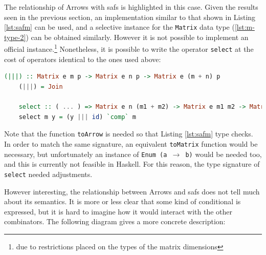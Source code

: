 \documentclass[
  oneside,
  11pt, a4paper,
  footinclude=true,
  headinclude=true,
  cleardoublepage=empty
]{scrbook}
\theoremstyle{definition}
\theoremstyle{definition}
\begin{document}
	    The relationship of Arrows with \glspl{saf} is highlighted in this case. Given the results seen in the previous section, an implementation similar to that shown in Listing \ref{lst:safm} can be used, and a selective instance for the \texttt{Matrix} data type (\ref{lst:m-type-2}) can be obtained similarly. However it is not possible to implement an official instance.\footnote{due to restrictions placed on the types of the matrix dimensions} Nonetheless, it is possible to write the operator \texttt{select} at the cost of operators identical to the ones used above:
	    
        \begin{lstlisting}[language=Haskell, label={lst:safm2}, caption={LAoP Selective instance},captionpos=b]
    (|||) :: Matrix e m p -> Matrix e n p -> Matrix e (m + n) p
    (|||) = Join
    
    select :: ( ... ) => Matrix e n (m1 + m2) -> Matrix e m1 m2 -> Matrix e n m2
    select m y = (y ||| id) `comp` m
        \end{lstlisting}{}
        
        Note that the function \texttt{toArrow} is needed so that Listing \ref{lst:safm} type checks. In order to match the same signature, an equivalent \texttt{toMatrix} function would be necessary, but unfortunately an instance of \texttt{Enum (a $\rightarrow$ b)} would be needed too, and this is currently not feasible in Haskell. For this reason, the type signature of \texttt{select} needed adjustments.
        
        However interesting, the relationship between Arrows and \glspl{saf} does not tell much about its semantics. It is more or less clear that some kind of conditional is expressed, but it is hard to imagine how it would interact with the other combinators. The following diagram gives a more concrete description:
        \vskip0.2cm
        
        \begin{center}
        \end{center}
        
\end{document}
